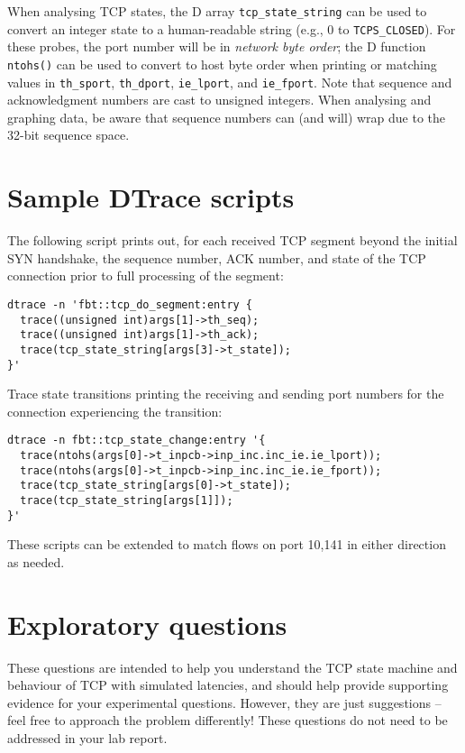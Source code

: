 \documentclass[a4paper,10pt]{article}
\begin{document}
When analysing TCP states, the D array \texttt{tcp\_state\_string} can be used
to convert an integer state to a human-readable string (e.g., 0 to
\texttt{TCPS\_CLOSED}).
For these probes, the port number will be in \textit{network byte order}; the
D function \texttt{ntohs()} can be used to convert to host byte order when
printing or matching values in \texttt{th\_sport}, \texttt{th\_dport},
\texttt{ie\_lport}, and \texttt{ie\_fport}.
Note that sequence and acknowledgment numbers are cast to unsigned integers.
When analysing and graphing data, be aware that sequence numbers can (and
will) wrap due to the 32-bit sequence space.

\section*{Sample DTrace scripts}

The following script prints out, for each received TCP segment beyond the
initial SYN handshake, the sequence number, ACK number, and state of the TCP
connection prior to full processing of the segment:

\begin{verbatim}
dtrace -n 'fbt::tcp_do_segment:entry {
  trace((unsigned int)args[1]->th_seq);
  trace((unsigned int)args[1]->th_ack);
  trace(tcp_state_string[args[3]->t_state]);
}'
\end{verbatim}

\noindent
Trace state transitions printing the receiving and sending port numbers for
the connection experiencing the transition:

\begin{verbatim}
dtrace -n fbt::tcp_state_change:entry '{
  trace(ntohs(args[0]->t_inpcb->inp_inc.inc_ie.ie_lport));
  trace(ntohs(args[0]->t_inpcb->inp_inc.inc_ie.ie_fport));
  trace(tcp_state_string[args[0]->t_state]);
  trace(tcp_state_string[args[1]]);
}'
\end{verbatim}

\noindent
These scripts can be extended to match flows on port 10,141 in either
direction as needed.

\section*{Exploratory questions}

These questions are intended to help you understand the TCP state machine and
behaviour of TCP with simulated latencies, and should help provide supporting
evidence for your experimental questions.
However, they are just suggestions -- feel free to approach the problem
differently!
These questions do not need to be addressed in your lab report.
\end{document}
